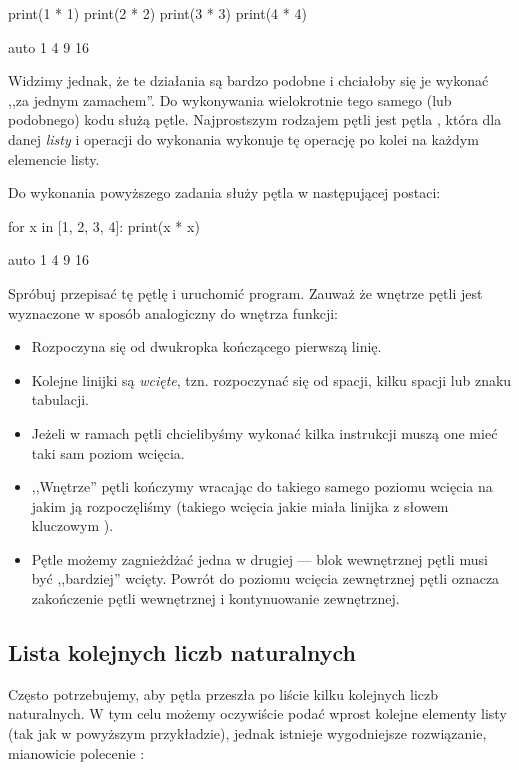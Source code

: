 \begin{CodeFrame}[python]{.5\textwidth}
print(1 * 1)
print(2 * 2)
print(3 * 3)
print(4 * 4)
\end{CodeFrame}
\begin{CodeFrame}{auto}
1
4
9
16
\end{CodeFrame}

Widzimy jednak, że te działania są bardzo podobne i chciałoby się je wykonać ,,za jednym zamachem''.
Do wykonywania wielokrotnie tego samego (lub podobnego) kodu służą pętle.
Najprostszym rodzajem pętli jest pętla , która dla danej \emph{listy} i operacji do wykonania
wykonuje tę operację po kolei na każdym elemencie listy.

Do wykonania powyższego zadania służy pętla  w następującej postaci:

\begin{CodeFrame}[python]{.5\textwidth}
for x in [1, 2, 3, 4]:
    print(x * x)
\end{CodeFrame}
\begin{CodeFrame}{auto}
1
4
9
16
\end{CodeFrame}

\noindent Spróbuj przepisać tę pętlę i uruchomić program.
Zauważ że wnętrze pętli jest wyznaczone w sposób analogiczny do wnętrza funkcji:
\begin{itemize}
	\item Rozpoczyna się od dwukropka kończącego pierwszą linię.
	\item Kolejne linijki są \emph{wcięte}, tzn. rozpoczynać się od spacji, kilku spacji lub znaku tabulacji.
	\item Jeżeli w ramach pętli chcielibyśmy wykonać kilka instrukcji muszą one mieć taki sam poziom wcięcia.
	\item ,,Wnętrze'' pętli kończymy wracając do takiego samego poziomu wcięcia na jakim ją rozpoczęliśmy
	      (takiego wcięcia jakie miała linijka z słowem kluczowym ).
	\item Pętle możemy zagnieżdżać jedna w drugiej --- blok wewnętrznej pętli musi być ,,bardziej'' wcięty.
	Powrót do poziomu wcięcia zewnętrznej pętli oznacza zakończenie pętli wewnętrznej i kontynuowanie zewnętrznej.
\end{itemize}

\subsection{Lista kolejnych liczb naturalnych}
Często potrzebujemy, aby pętla przeszła po liście kilku kolejnych liczb naturalnych.
W tym celu możemy oczywiście podać wprost kolejne elementy listy (tak jak w powyższym przykładzie),
jednak istnieje wygodniejsze rozwiązanie, mianowicie polecenie :

